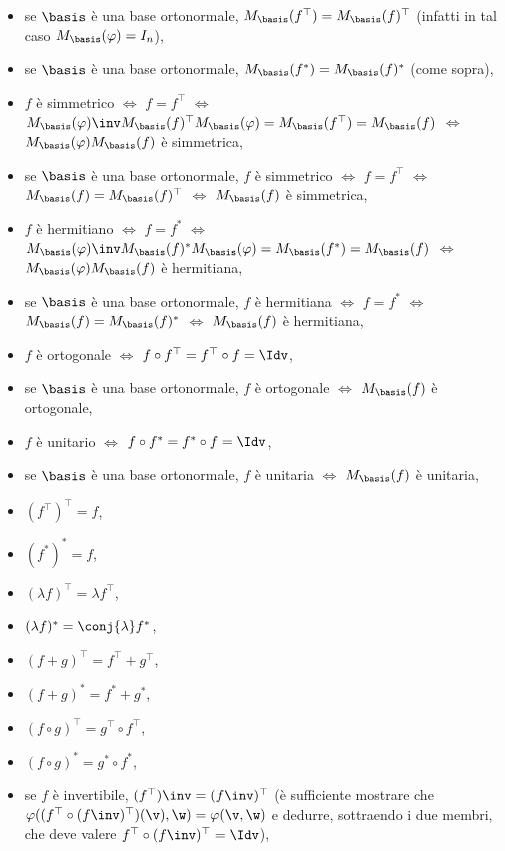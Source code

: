 \documentclass[10pt,landscape]{article}
\begin{document}
\begin{multicols}{3}
		\begin{itemize}
			\item se $\basis$ è una base ortonormale, $M_\basis(f^\top) = M_\basis(f)^\top$ (infatti in tal caso $M_\basis(\varphi) = I_n$),
			\item se $\basis$ è una base ortonormale, $M_\basis(f^*) = M_\basis(f)^*$ (come sopra),
			\item $f$ è simmetrico $\iff$ $f = f^\top$ $\iff$ $M_\basis(\varphi)\inv M_\basis(f)^\top M_\basis(\varphi) = M_\basis(f^\top) = M_\basis(f)$ $\iff$ $M_\basis(\varphi) M_\basis(f)$ è simmetrica,
			\item se $\basis$ è una base ortonormale, $f$ è simmetrico $\iff$ $f = f^\top$ $\iff$ $M_\basis(f) = M_\basis(f)^\top$ $\iff$ $M_\basis(f)$ è simmetrica,
			\item $f$ è hermitiano $\iff$ $f = f^*$ $\iff$ $M_\basis(\varphi)\inv M_\basis(f)^* M_\basis(\varphi) = M_\basis(f^*) = M_\basis(f)$ $\iff$ $M_\basis(\varphi) M_\basis(f)$ è hermitiana,
			\item se $\basis$ è una base ortonormale, $f$ è hermitiana $\iff$ $f = f^*$ $\iff$ $M_\basis(f) = M_\basis(f)^*$ $\iff$ $M_\basis(f)$ è hermitiana,
			\item $f$ è ortogonale $\iff$ $f \circ f^\top = f^\top \circ f = \Idv$,
			\item se $\basis$ è una base ortonormale, $f$ è ortogonale $\iff$ $M_\basis(f)$ è ortogonale,
			\item $f$ è unitario $\iff$ $f \circ f^* = f^* \circ f = \Idv$,
			\item se $\basis$ è una base ortonormale, $f$ è unitaria $\iff$ $M_\basis(f)$ è unitaria,
			\item $(f^\top)^\top = f$,
			\item $(f^*)^* = f$,
			\item $(\lambda f)^\top = \lambda f^\top$,
			\item $(\lambda f)^* = \conj{\lambda} f^*$,
			\item $(f + g)^\top = f^\top + g^\top$,
			\item $(f + g)^* = f^* + g^*$,
			\item $(f \circ g)^\top = g^\top \circ f^\top$,
			\item $(f \circ g)^* = g^* \circ f^*$,
			\item se $f$ è invertibile, $(f^\top)\inv = (f\inv)^\top$ (è sufficiente mostrare che $\varphi((f^\top \circ (f\inv)^\top)(\v), \w) = \varphi(\v, \w)$ e dedurre,
			sottraendo i due membri, che deve valere $f^\top \circ (f\inv)^\top = \Idv$),

\end{itemize}
\end{multicols}
\end{document}
